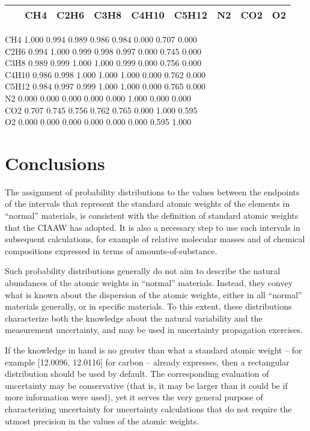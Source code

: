 \documentclass[a5paper,openany]{book}
\begin{document}
\begin{tabular}{ccccccccc}
~ & CH4 & C2H6 & C3H8 & C4H10 & C5H12 & N2 & CO2 & O2 \\
	\hline
\end{tabular}

CH4 1.000 0.994 0.989 0.986 0.984 0.000 0.707 0.000 \\
C2H6 0.994 1.000 0.999 0.998 0.997 0.000 0.745 0.000\\
C3H8 0.989 0.999 1.000 1.000 0.999 0.000 0.756 0.000\\
C4H10 0.986 0.998 1.000 1.000 1.000 0.000 0.762 0.000\\
C5H12 0.984 0.997 0.999 1.000 1.000 0.000 0.765 0.000\\
N2 0.000 0.000 0.000 0.000 0.000 1.000 0.000 0.000\\
CO2 0.707 0.745 0.756 0.762 0.765 0.000 1.000 0.595\\
O2 0.000 0.000 0.000 0.000 0.000 0.000 0.595 1.000\\

\section{Conclusions}

The assignment of probability distributions to the values between the endpoints of the intervals that represent
the standard atomic weights of the elements in “normal” materials, is consistent with the definition
of standard atomic weights that the CIAAW has adopted. It is also a necessary step to use such intervals in
subsequent calculations, for example of relative molecular masses and of chemical compositions expressed
in terms of amounts-of-substance.

Such probability distributions generally do not aim to describe the natural abundances of the atomic
weights in “normal” materials. Instead, they convey what is known about the dispersion of the atomic
weights, either in all “normal” materials generally, or in specific materials. To this extent, these distributions
characterize both the knowledge about the natural variability and the measurement uncertainty, and may be
used in uncertainty propagation exercises.

If the knowledge in hand is no greater than what a standard atomic weight – for example [12.0096,
12.0116] for carbon – already expresses, then a rectangular distribution should be used by default. The corresponding
evaluation of uncertainty may be conservative (that is, it may be larger than it could be if more
information were used), yet it serves the very general purpose of characterizing uncertainty for uncertainty
calculations that do not require the utmost precision in the values of the atomic weights.
\end{document}
